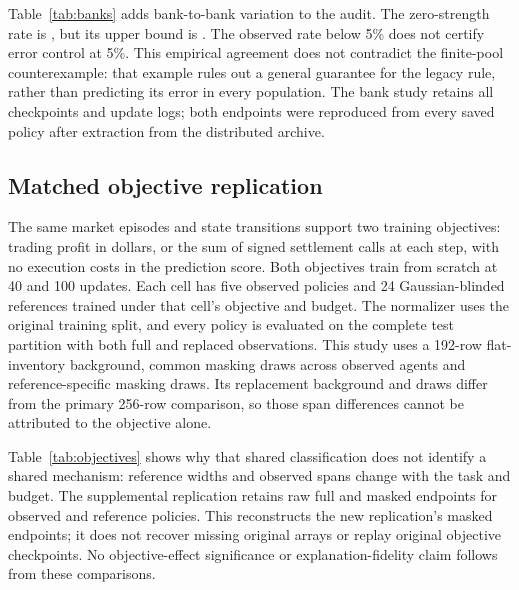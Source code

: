 \documentclass[10pt,twocolumn]{article}
\begin{document}
\begin{table}[t]
\centering\small
\caption{Independent-bank calibration: \BankCount{} banks with 30 trials per
strength in each bank. Rates and pointwise bounded-bank intervals are rounded
to three decimals. All declared trials remain in the denominator. Unres. counts
unresolved comparisons. The signal alternatives measure learning and comparison
together, not test power in isolation.}
\label{tab:banks}
\BankTable
\end{table}
Table~\ref{tab:banks} adds bank-to-bank variation to the audit. The zero-strength
rate is \BankNullRate{}, but its upper bound is \BankNullUpper. The observed
rate below 5\% does not certify error control at 5\%. \BankAgreementParagraph{}
This empirical agreement does not contradict the finite-pool counterexample:
that example rules out a general guarantee for the legacy rule, rather than
predicting its error in every population. The bank study retains all \BankModelCount{}
checkpoints and update logs; both endpoints were reproduced from every saved
policy after extraction from the distributed archive.

\subsection{Matched objective replication}
The same market episodes and state transitions support two training objectives:
trading profit in dollars, or the sum of signed settlement calls at each step,
with no execution costs in the prediction score. Both objectives train from
scratch at 40 and 100 updates. Each cell has five observed policies and 24
Gaussian-blinded references trained under that cell's objective and budget.
The normalizer uses the original training split, and every policy is evaluated
on the complete test partition with both full and replaced observations.
This study uses a 192-row flat-inventory background, common masking draws
across observed agents and reference-specific masking draws. Its replacement
background and draws differ from the primary 256-row comparison, so those
span differences cannot be attributed to the objective alone.
\begin{table}[t]
\centering\small
\caption{Matched-budget objective cells. Return and span are means over five
observed seeds. Reference SD describes 24 blinded policies. Prediction uses
signed-call score units; trading uses dollars. Cross-objective magnitudes and
standardized distances do not measure a causal objective effect.}
\label{tab:objectives}
\ObjectiveTable
\end{table}
\ObjectiveDecisionParagraph{} Table~\ref{tab:objectives} shows why that shared classification does
not identify a shared mechanism: reference widths and observed spans change
with the task and budget. The supplemental replication retains raw full and
masked endpoints for \ObjectiveObservedCount{} observed and
\ObjectiveReferenceCount{} reference policies. \ObjectiveMatchParagraph{} This reconstructs
the new replication's masked endpoints; it does not recover missing original
arrays or replay original objective checkpoints. No objective-effect
significance or explanation-fidelity claim follows from these comparisons.
\end{document}
